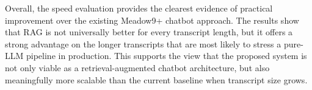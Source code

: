 Overall, the speed evaluation provides the clearest evidence of practical improvement over the existing Meadow9+ chatbot approach. The results show that RAG is not universally better for every transcript length, but it offers a strong advantage on the longer transcripts that are most likely to stress a pure-LLM pipeline in production. This supports the view that the proposed system is not only viable as a retrieval-augmented chatbot architecture, but also meaningfully more scalable than the current baseline when transcript size grows.
